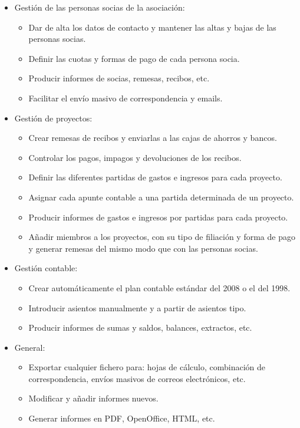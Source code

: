 \begin{itemize}
\item Gestión de las personas socias de la asociación:

\begin{itemize}
\item Dar de alta los datos de contacto y mantener las altas y bajas de
las personas socias.
\item Definir las cuotas y formas de pago de cada persona socia.
\item Producir informes de socias, remesas, recibos, etc.
\item Facilitar el envío masivo de correspondencia y emails.
\end{itemize}
\item Gestión de proyectos:

\begin{itemize}
\item Crear remesas de recibos y enviarlas a las cajas de ahorros y
bancos.
\item Controlar los pagos, impagos y devoluciones de los recibos.
\item Definir las diferentes partidas de gastos e ingresos para cada
proyecto.
\item Asignar cada apunte contable a una partida determinada de un
proyecto.
\item Producir informes de gastos e ingresos por partidas para cada
proyecto.
\item Añadir miembros a los proyectos, con su tipo de filiación y
forma de pago y generar remesas del mismo modo que con las personas
socias.
\end{itemize}
\item Gestión contable:

\begin{itemize}
\item Crear automáticamente el plan contable estándar del 2008 o el
del 1998.
\item Introducir asientos manualmente y a partir de asientos tipo.
\item Producir informes de sumas y saldos, balances, extractos, etc.
\end{itemize}
\item General:

\begin{itemize}
\item Exportar cualquier fichero para: hojas de cálculo, combinación
de correspondencia, envíos masivos de correos electrónicos, etc.
\item Modificar y añadir informes nuevos.
\item Generar informes en PDF, OpenOffice, HTML, etc.
\end{itemize}
\end{itemize}

